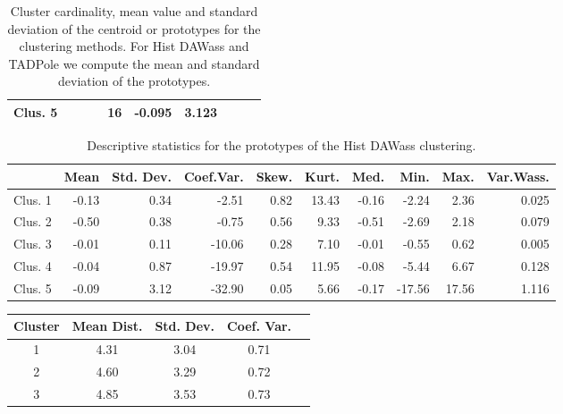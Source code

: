 \documentclass{bmcart}
\begin{document}
\begin{backmatter}
\begin{table}[h!]
{\begin{tabular}{l|cll|c|c|c|cll|}
			\multicolumn{1}{|l|}{\textbf{Clus. 5}} & \multicolumn{1}{l}{}                &                                    &                            & 16                                  & -0.095                             & 3.123                               & \multicolumn{1}{l}{}                &                                    &                            \\ \hline
		\end{tabular}%
	}
	\caption{Cluster cardinality, mean value and standard deviation of the centroid or prototypes for the clustering methods. For Hist DAWass and TADPole we compute the mean and standard deviation of the prototypes.}
	\label{tab:CardTable}
\end{table}

\begin{table}[h!]
	\centering
	\begin{tabular}{r|rrrrrrrr|r}
		\hline
		& Mean & Std. Dev. & Coef.Var. & Skew. & Kurt. & Med. & Min. & Max. & Var.Wass. \\ 
		\hline
		Clus. 1 & -0.13 & 0.34 & -2.51 & 0.82 & 13.43 & -0.16 & -2.24 & 2.36 & 0.025 \\ 
		Clus. 2 & -0.50 & 0.38 & -0.75 & 0.56 & 9.33 & -0.51 & -2.69 & 2.18 & 0.079 \\ 	
		Clus. 3 & -0.01 & 0.11 & -10.06 & 0.28 & 7.10 & -0.01 & -0.55 & 0.62 & 0.005 \\ 
		Clus. 4 & -0.04 & 0.87 & -19.97 & 0.54 & 11.95 & -0.08 & -5.44 & 6.67 & 0.128 \\ 
		Clus. 5 & -0.09 & 3.12 & -32.90 & 0.05 & 5.66 & -0.17 & -17.56 & 17.56 & 1.116 \\ 
		\hline
	\end{tabular}
	\caption{Descriptive statistics for the prototypes of the Hist DAWass clustering.}
	\label{tab:moments}
\end{table}

\begin{table}[h!]
	\centering
	\begin{tabular}{ccccc}
		\hline
		Cluster & Mean Dist. & Std. Dev. & Coef. Var. \\ 
		\hline
		1 & 4.31 & 3.04 & 0.71 \\ 
		2 & 4.60 & 3.29 & 0.72 \\ 
		3 & 4.85 & 3.53 & 0.73 \\ 
		

\end{tabular}
\end{table}
\end{backmatter}
\end{document}
